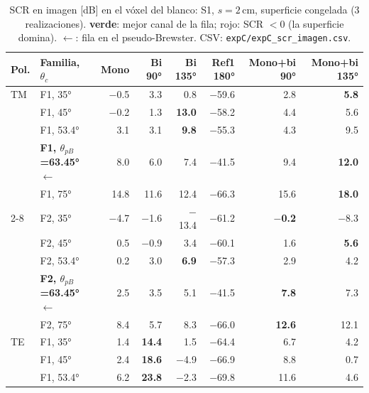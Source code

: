 \begin{table}[H]
\centering\small
\caption{SCR en imagen [dB] en el vóxel del blanco: S1, $s=2$\,cm, superficie congelada (3 realizaciones). \colorbox{mejor}{\textbf{verde}}: mejor canal de la fila; \colorbox{peor}{rojo}: SCR $<0$ (la superficie domina). $\leftarrow$: fila en el pseudo-Brewster. CSV: \texttt{expC/expC\_scr\_imagen.csv}.}
\label{tab:C_scr}
\begin{tabular}{@{}llrrrrrr@{}}
\toprule
Pol. & Familia, $\theta_c$ & Mono & Bi 90° & Bi 135° & Ref1 180° & Mono+bi 90° & Mono+bi 135° \\
\midrule
TM & F1, 35° & \cellcolor{peor}$-$0.5 & 3.3 & 0.8 & \cellcolor{peor}$-$59.6 & 2.8 & \cellcolor{mejor}\textbf{5.8} \\
 & F1, 45° & \cellcolor{peor}$-$0.2 & 1.3 & \cellcolor{mejor}\textbf{13.0} & \cellcolor{peor}$-$58.2 & 4.4 & 5.6 \\
 & F1, 53.4° & 3.1 & 3.1 & \cellcolor{mejor}\textbf{9.8} & \cellcolor{peor}$-$55.3 & 4.3 & 9.5 \\
 & \textbf{F1, $\theta_{pB}$=63.45°} $\leftarrow$ & 8.0 & 6.0 & 7.4 & \cellcolor{peor}$-$41.5 & 9.4 & \cellcolor{mejor}\textbf{12.0} \\
 & F1, 75° & 14.8 & 11.6 & 12.4 & \cellcolor{peor}$-$66.3 & 15.6 & \cellcolor{mejor}\textbf{18.0} \\
\cmidrule(l){2-8}
 & F2, 35° & \cellcolor{peor}$-$4.7 & \cellcolor{peor}$-$1.6 & \cellcolor{peor}$-$13.4 & \cellcolor{peor}$-$61.2 & \cellcolor{mejor}\textbf{$-$0.2} & \cellcolor{peor}$-$8.3 \\
 & F2, 45° & 0.5 & \cellcolor{peor}$-$0.9 & 3.4 & \cellcolor{peor}$-$60.1 & 1.6 & \cellcolor{mejor}\textbf{5.6} \\
 & F2, 53.4° & 0.2 & 3.0 & \cellcolor{mejor}\textbf{6.9} & \cellcolor{peor}$-$57.3 & 2.9 & 4.2 \\
 & \textbf{F2, $\theta_{pB}$=63.45°} $\leftarrow$ & 2.5 & 3.5 & 5.1 & \cellcolor{peor}$-$41.5 & \cellcolor{mejor}\textbf{7.8} & 7.3 \\
 & F2, 75° & 8.4 & 5.7 & 8.3 & \cellcolor{peor}$-$66.0 & \cellcolor{mejor}\textbf{12.6} & 12.1 \\
\midrule
TE & F1, 35° & 1.4 & \cellcolor{mejor}\textbf{14.4} & 1.5 & \cellcolor{peor}$-$64.4 & 6.7 & 4.2 \\
 & F1, 45° & 2.4 & \cellcolor{mejor}\textbf{18.6} & \cellcolor{peor}$-$4.9 & \cellcolor{peor}$-$66.9 & 8.8 & 0.7 \\
 & F1, 53.4° & 6.2 & \cellcolor{mejor}\textbf{23.8} & \cellcolor{peor}$-$2.3 & \cellcolor{peor}$-$69.8 & 11.6 & 4.6 \\

\end{tabular}
\end{table}
